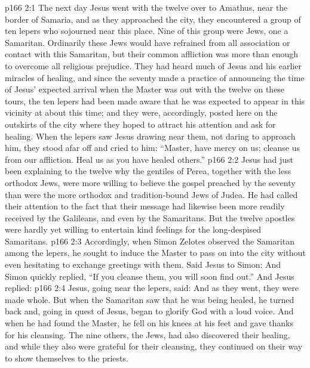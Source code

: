 \vs p166 2:1 The next day Jesus went with the twelve over to Amathus, near the border of Samaria, and as they approached the city, they encountered a group of ten lepers who sojourned near this place. Nine of this group were Jews, one a Samaritan. Ordinarily these Jews would have refrained from all association or contact with this Samaritan, but their common affliction was more than enough to overcome all religious prejudice. They had heard much of Jesus and his earlier miracles of healing, and since the seventy made a practice of announcing the time of Jesus’ expected arrival when the Master was out with the twelve on these tours, the ten lepers had been made aware that he was expected to appear in this vicinity at about this time; and they were, accordingly, posted here on the outskirts of the city where they hoped to attract his attention and ask for healing. When the lepers saw Jesus drawing near them, not daring to approach him, they stood afar off and cried to him: “Master, have mercy on us; cleanse us from our affliction. Heal us as you have healed others.”
\vs p166 2:2 Jesus had just been explaining to the twelve why the gentiles of Perea, together with the less orthodox Jews, were more willing to believe the gospel preached by the seventy than were the more orthodox and tradition\hyp{}bound Jews of Judea. He had called their attention to the fact that their message had likewise been more readily received by the Galileans, and even by the Samaritans. But the twelve apostles were hardly yet willing to entertain kind feelings for the long\hyp{}despised Samaritans.
\vs p166 2:3 Accordingly, when Simon Zelotes observed the Samaritan among the lepers, he sought to induce the Master to pass on into the city without even hesitating to exchange greetings with them. Said Jesus to Simon:  And Simon quickly replied, “If you cleanse them, you will soon find out.” And Jesus replied: 
\vs p166 2:4 Jesus, going near the lepers, said:  And as they went, they were made whole. But when the Samaritan saw that he was being healed, he turned back and, going in quest of Jesus, began to glorify God with a loud voice. And when he had found the Master, he fell on his knees at his feet and gave thanks for his cleansing. The nine others, the Jews, had also discovered their healing, and while they also were grateful for their cleansing, they continued on their way to show themselves to the priests.

